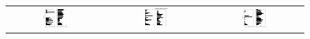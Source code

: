\documentclass[12pt]{article}
\begin{document}
\begin{figure}[!htb]
\begin{tabular}{ccc}
     \includegraphics[width=0.3\textwidth]{fig/ccf/ccf7} & \includegraphics[width=0.3\textwidth]{fig/ccf/ccf8} & \includegraphics[width=0.3\textwidth]{fig/ccf/ccf9} 
 \end{tabular}
\end{figure}

\FloatBarrier
\clearpage
\end{document}
